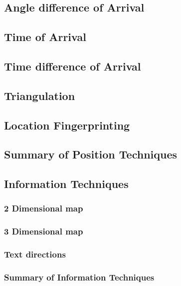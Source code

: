  \subsection{Angle difference of Arrival}

  \subsection{Time of Arrival}

  \subsection{Time difference of Arrival}

  \subsection{Triangulation}

  \subsection{Location Fingerprinting}

  \subsection{Summary of Position Techniques}

\subsection{Information Techniques}

  \subsubsection{2 Dimensional map}

  \subsubsection{3 Dimensional map}

  \subsubsection{Text directions}

  \subsubsection{Summary of Information Techniques}

